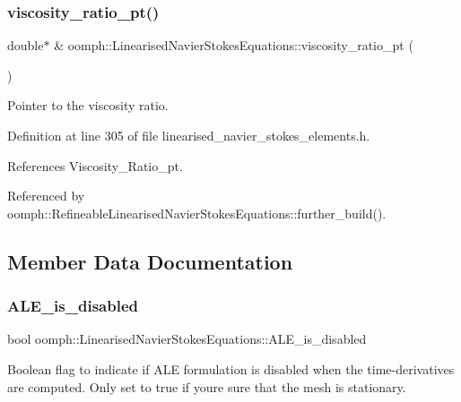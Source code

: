 \subsubsection{\texorpdfstring{viscosity\+\_\+ratio\+\_\+pt()}{viscosity\_ratio\_pt()}}
{\footnotesize\ttfamily double$\ast$ \& oomph\+::\+Linearised\+Navier\+Stokes\+Equations\+::viscosity\+\_\+ratio\+\_\+pt (\begin{DoxyParamCaption}{ }\end{DoxyParamCaption})\hspace{0.3cm}{\ttfamily [inline]}}



Pointer to the viscosity ratio. 



Definition at line 305 of file linearised\+\_\+navier\+\_\+stokes\+\_\+elements.\+h.



References Viscosity\+\_\+\+Ratio\+\_\+pt.



Referenced by oomph\+::\+Refineable\+Linearised\+Navier\+Stokes\+Equations\+::further\+\_\+build().



\subsection{Member Data Documentation}
\mbox{\label{classoomph_1_1LinearisedNavierStokesEquations_a654d71824067f1c950e48dd4dca9be1f}} 
\subsubsection{\texorpdfstring{A\+L\+E\+\_\+is\+\_\+disabled}{ALE\_is\_disabled}}
{\footnotesize\ttfamily bool oomph\+::\+Linearised\+Navier\+Stokes\+Equations\+::\+A\+L\+E\+\_\+is\+\_\+disabled\hspace{0.3cm}{\ttfamily [protected]}}



Boolean flag to indicate if A\+LE formulation is disabled when the time-\/derivatives are computed. Only set to true if you\textquotesingle{}re sure that the mesh is stationary. 



